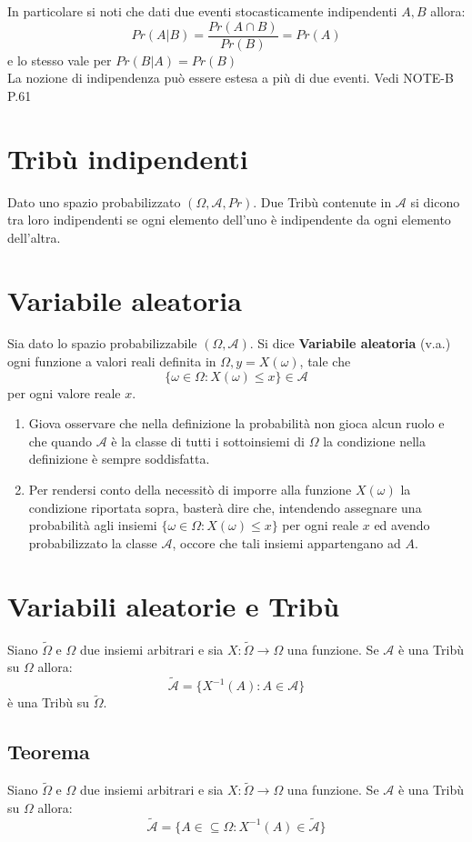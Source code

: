 \documentclass[a4paper]{report}
\begin{document}
  In particolare si noti che dati due eventi stocasticamente indipendenti $A, B$ allora:
  $$Pr(A|B) = \frac{Pr(A \cap B)}{Pr(B)} = Pr(A)$$
  e lo stesso vale per $Pr(B|A) = Pr(B)$\\

  La nozione di indipendenza può essere estesa a più di due eventi. Vedi NOTE-B P.61

  \section{Tribù indipendenti}
  Dato uno spazio probabilizzato $(\Omega, \mathcal{A}, Pr)$. Due Tribù contenute in $\mathcal{A}$ si dicono tra loro indipendenti se ogni elemento dell'uno è indipendente da ogni elemento dell'altra.

  \section{Variabile aleatoria}
  Sia dato lo spazio probabilizzabile $(\Omega, \mathcal{A})$. Si dice \textbf{Variabile aleatoria} (v.a.) ogni funzione a valori reali definita in $\Omega, y = X(\omega)$, tale che
  $$ \{\omega \in \Omega : X(\omega) \leq x\} \in \mathcal{A} $$ per ogni valore reale $x$.
  \begin{enumerate}
    \item Giova osservare che nella definizione la probabilità non gioca alcun ruolo e che quando $\mathcal{A}$ è la classe di tutti i sottoinsiemi di $\Omega$ la condizione nella definizione è sempre soddisfatta.
    \item Per rendersi conto della necessitò di imporre alla funzione $X(\omega)$ la condizione riportata sopra, basterà dire che, intendendo assegnare una probabilità agli insiemi $\{\omega \in \Omega : X(\omega) \leq x\}$ per ogni reale $x$ ed avendo probabilizzato la classe $\mathcal{A}$, occore che tali insiemi appartengano ad $A$.
  \end{enumerate}

  \section{Variabili aleatorie e Tribù}
  Siano $\tilde{\Omega}$ e $\Omega$ due insiemi arbitrari e sia $X: \tilde{\Omega} \rightarrow \Omega$ una funzione. Se $\mathcal{A}$ è una Tribù su $\Omega$ allora:
  $$ \tilde{\mathcal{A}} = \{ X^{-1}(A):A \in \mathcal{A} \} $$
  è una Tribù su $\tilde{\Omega}$.

  \subsection{Teorema}
  Siano $\tilde{\Omega}$ e $\Omega$ due insiemi arbitrari e sia $X: \tilde{\Omega} \rightarrow \Omega$ una funzione. Se $\mathcal{A}$ è una Tribù su $\Omega$ allora:
  $$ \tilde{\mathcal{A}} = \{ A \in \subseteq \Omega: X^{-1}(A) \in \tilde{\mathcal{A}}\} $$
\end{document}
